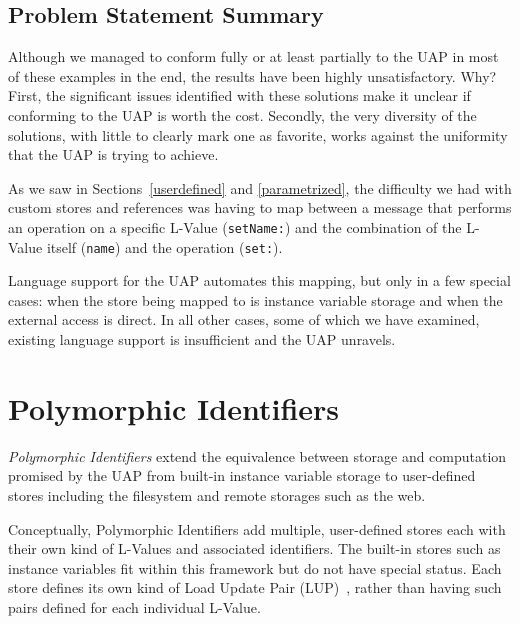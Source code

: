 \documentclass[preprint]{sigplanconf}
\begin{document}
\subsection{Problem Statement Summary}

Although we  managed to conform fully or at least partially to the UAP in most
of these examples in the end, the results have been highly unsatisfactory.  Why?   
First, the significant issues identified with these solutions make it unclear if
conforming to the UAP is worth the cost.  Secondly, the very diversity of the
solutions, with little to clearly mark one as favorite, works against the 
uniformity that the UAP is trying to achieve.

As we saw in Sections~\ref{userdefined} and \ref{parametrized}, the difficulty
we had with custom stores and references was having to map between 
a message that performs an operation on a specific L-Value ({\tt setName:})
and the combination of the  L-Value itself ({\tt name}) and the operation ({\tt set:}).

Language support for the UAP automates this mapping, but only in a few
special cases:  when the store being mapped to is instance variable storage
and when the external access is direct.  In all other cases, some of which
we have examined, existing language support is insufficient and the
UAP unravels.



\section{Polymorphic Identifiers}
\label{polymorphic-identifiers}

\emph{Polymorphic Identifiers} extend the equivalence between storage and 
computation promised by the UAP from built-in instance variable storage
to user-defined stores including the filesystem and remote storages such
as the web.

Conceptually, Polymorphic Identifiers add multiple, user-defined stores each with their
own kind of L-Values and associated identifiers.  The built-in stores such
as instance variables fit within this framework but do not have special
status.  Each store defines its own kind of Load Update Pair (LUP)~\cite{StracheyFund},
rather than having such pairs defined for each individual L-Value.
\end{document}
